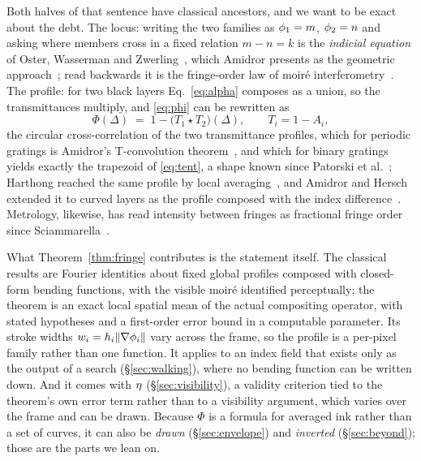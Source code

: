 Both halves of that sentence have classical ancestors, and we want to be exact
about the debt. The locus: writing the two families as $\phi_1=m$, $\phi_2=n$
and asking where members cross in a fixed relation $m-n=k$ is the \emph{indicial
equation} of Oster, Wasserman and Zwerling~\cite{Oster1964}, which Amidror
presents as the geometric approach~\cite{Amidror2009Theory}; read backwards it
is the fringe-order law of moir\'e interferometry~\cite{Post2008Moire}. The
profile: for two black layers Eq.~\ref{eq:alpha} composes as a union, so the
transmittances multiply, and \eqref{eq:phi} can be rewritten as
\begin{equation}
  \Phi(\Delta) \;=\; 1-\big(T_1\star T_2\big)(\Delta),
  \qquad T_i = 1-A_i,
  \label{eq:tconv}
\end{equation}
the circular cross-correlation of the two transmittance profiles, which for
periodic gratings is Amidror's T-convolution
theorem~\cite{Amidror1994TConv, Amidror2009Theory}, and which for binary
gratings yields exactly the trapezoid of \eqref{eq:tent}, a shape known since
Patorski et al.~\cite{Patorski1976Profile}; Harthong reached the same profile by
local averaging~\cite{Harthong1981Moire}, and Amidror and Hersch extended it to
curved layers as the profile composed with the index
difference~\cite{Amidror1998Fourier}. Metrology, likewise, has read intensity
between fringes as fractional fringe order since
Sciammarella~\cite{Sciammarella1965Basic}.

What Theorem~\ref{thm:fringe} contributes is the statement itself. The
classical results are Fourier identities about fixed global profiles composed
with closed-form bending functions, with the visible moir\'e identified
perceptually; the theorem is an exact local spatial mean of the actual
compositing operator, with stated hypotheses and a first-order error bound in a
computable parameter. Its stroke widths $w_i=h_i\lVert\nabla\phi_i\rVert$ vary
across the frame, so the profile is a per-pixel family rather than one function.
It applies to an index field that exists only as the output of a search
(\S\ref{sec:walking}), where no bending function can be written down. And it
comes with $\eta$ (\S\ref{sec:visibility}), a validity criterion tied to the
theorem's own error term rather than to a visibility argument, which varies over
the frame and can be drawn. Because $\Phi$ is a formula for averaged ink rather
than a set of curves, it can also be \emph{drawn} (\S\ref{sec:envelope}) and
\emph{inverted} (\S\ref{sec:beyond}); those are the parts we lean on.

